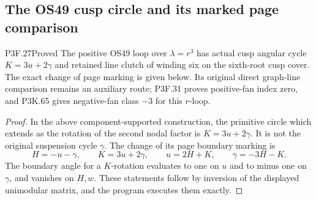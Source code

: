 \subsection{The OS49 cusp circle and its marked page comparison}
\begin{statement}{P3F.27}{Proved}
The positive OS49 loop over $\lambda=r^3$ has actual cusp angular cycle $K=3u+2\gamma$ and retained line clutch of winding six on the sixth-root cusp cover. The exact change of page marking is given below. Its original direct graph-line comparison remains an auxiliary route; P3F.31 proves positive-fan index zero, and P3K.65 gives negative-fan class \(-3\) for this \(r\)-loop.
\end{statement}
\begin{proof}
In the above component-supported construction, the primitive circle which extends as the rotation of the second nodal factor is \(K=3u+2\gamma\). It is not the original suspension cycle \(\gamma\). The change of its page boundary marking is \[
 H=-u-\gamma,\qquad K=3u+2\gamma,
 \qquad u=2H+K,\qquad\gamma=-3H-K.               \tag{P3F.27.1}
\] The boundary angle for a \(K\)-rotation evaluates to one on \(u\) and to minus one on \(\gamma\), and vanishes on \(H,w\). These statements follow by inversion of the displayed unimodular matrix, and the program executes them exactly.


\end{proof}
